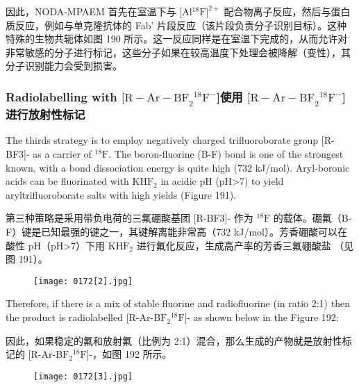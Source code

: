 \documentclass[dvipsnames, svgnames,a4paper,11pt]{article}
\begin{document}
因此，NODA-MPAEM 首先在室温下与 [Al${}^\mathrm{18}\mathrm{F}]^{2+}$ 配合物离子反应，然后与蛋白质反应，例如与单克隆抗体的 Fab' 片段反应（该片段负责分子识别目标）。这种特殊的生物共轭体如图 190 所示。这一反应同样是在室温下完成的，从而允许对非常敏感的分子进行标记，这些分子如果在较高温度下处理会被降解（变性），其分子识别能力会受到损害。

\subsubsection{Radiolabelling with $\mathrm{[R-Ar-BF}_2$${}^\mathrm{18}\mathrm{F^-}$]使用 $\mathrm{[R-Ar-BF}_2$${}^\mathrm{18}\mathrm{F^-}$] 进行放射性标记}

The thirds strategy is to employ negatively charged trifluoroborate group [R-BF3]- as
a carrier of ${}^\mathrm{18}\mathrm{F}$. The boron-fluorine (B-F) bond is one of the strongest known, with a
bond dissociation energy is quite high (732 kJ/mol). Aryl-boronic acids can be
fluorinated with KH$\mathrm{F}_2$ in acidic pH (pH>7) to yield aryltrifluoroborate salts \ce{[R-Ar-BF3]-}
with high yields (Figure 191).

第三种策略是采用带负电荷的三氟硼酸基团 [R-BF3]- 作为 ${}^\mathrm{18}\mathrm{F}$ 的载体。硼氟（B-F）键是已知最强的键之一，其键解离能非常高（732 kJ/mol）。芳香硼酸可以在酸性 pH（pH>7）下用 KH$\mathrm{F}_2$ 进行氟化反应，生成高产率的芳香三氟硼酸盐 \ce{[R-Ar-BF3]-}（见图 191）。

\begin{figure}[h]
	\centering
    \texttt{[image: 0172[2].jpg]}   
     \label{fig191}
\end{figure}

Therefore, if there is a mix of stable fluorine and radiofluorine (in ratio 2:1) then the
product is radiolabelled [R-Ar-B$\mathrm{F}_2$${}^\mathrm{18}\mathrm{F}$]- as shown below in the Figure 192:

因此，如果稳定的氟和放射氟（比例为 2:1）混合，那么生成的产物就是放射性标记的 [R-Ar-B$\mathrm{F}_2$${}^\mathrm{18}\mathrm{F}$]-，如图 192 所示。

\begin{figure}[h]
	\centering
    \texttt{[image: 0172[3].jpg]}   
     \label{fig192}
\end{figure}
\end{document}
